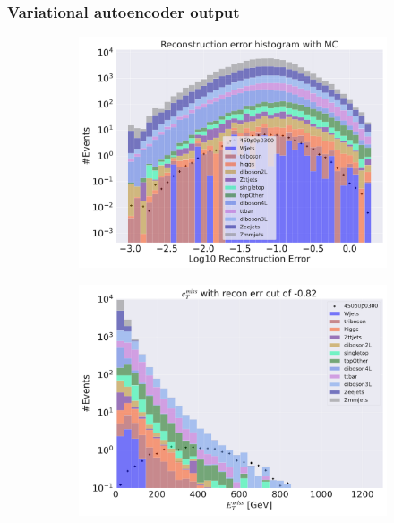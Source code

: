 \subsubsection*{Variational autoencoder output}

\begin{figure}[H]
    \centering
    \begin{subfigure}{.40\textwidth}
        \includegraphics[width=\textwidth]{Figures/VAE_testing/big/3lep/b_data_recon_big_rm3_feats_sig_450p0p0300.pdf}
        \caption{ }
        \label{fig:VAE_3lep_big_450_2}
    \end{subfigure}
    \hfill
    \begin{subfigure}{.40\textwidth}
        \includegraphics[width=\textwidth]{Figures/VAE_testing/big/3lep/b_data_recon_big_rm3_feats_sig_450p0p0300_etmiss_recon_errcut_-0.82.pdf}

\end{subfigure}
\end{figure}
